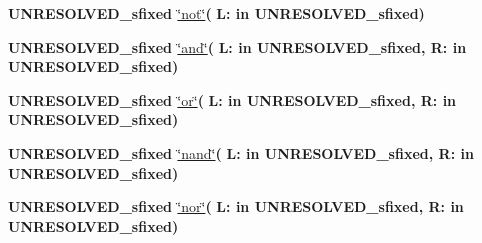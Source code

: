 \begin{DoxyCompactItemize}
\item 
{\bfseries {\bfseries \textcolor{vhdlchar}{U\+N\+R\+E\+S\+O\+L\+V\+E\+D\+\_\+sfixed}\textcolor{vhdlchar}{ }}} \hyperlink{class__fixed__pkg_a2e0c00aea2fff7197dbe8e20362fc7d8}{\char`\"{}not\char`\"{}}{\bfseries  ( }{\bfseries \textcolor{vhdlchar}{L\+: }\textcolor{stringliteral}{in }\textcolor{vhdlchar}{U\+N\+R\+E\+S\+O\+L\+V\+E\+D\+\_\+sfixed}}{\bfseries  )} 
\item 
{\bfseries {\bfseries \textcolor{vhdlchar}{U\+N\+R\+E\+S\+O\+L\+V\+E\+D\+\_\+sfixed}\textcolor{vhdlchar}{ }}} \hyperlink{class__fixed__pkg_adc4ad35b9dd0894e4fd7235d7f087dad}{\char`\"{}and\char`\"{}}{\bfseries  ( }{\bfseries \textcolor{vhdlchar}{L\+: }\textcolor{stringliteral}{in }\textcolor{vhdlchar}{U\+N\+R\+E\+S\+O\+L\+V\+E\+D\+\_\+sfixed}}{\bfseries  , \textcolor{vhdlchar}{R\+: }\textcolor{stringliteral}{in }\textcolor{vhdlchar}{U\+N\+R\+E\+S\+O\+L\+V\+E\+D\+\_\+sfixed}}{\bfseries  )} 
\item 
{\bfseries {\bfseries \textcolor{vhdlchar}{U\+N\+R\+E\+S\+O\+L\+V\+E\+D\+\_\+sfixed}\textcolor{vhdlchar}{ }}} \hyperlink{class__fixed__pkg_a41e213ebb1b825cf11e19cb15676a800}{\char`\"{}or\char`\"{}}{\bfseries  ( }{\bfseries \textcolor{vhdlchar}{L\+: }\textcolor{stringliteral}{in }\textcolor{vhdlchar}{U\+N\+R\+E\+S\+O\+L\+V\+E\+D\+\_\+sfixed}}{\bfseries  , \textcolor{vhdlchar}{R\+: }\textcolor{stringliteral}{in }\textcolor{vhdlchar}{U\+N\+R\+E\+S\+O\+L\+V\+E\+D\+\_\+sfixed}}{\bfseries  )} 
\item 
{\bfseries {\bfseries \textcolor{vhdlchar}{U\+N\+R\+E\+S\+O\+L\+V\+E\+D\+\_\+sfixed}\textcolor{vhdlchar}{ }}} \hyperlink{class__fixed__pkg_a84856af5530a77e6833c030318eb84e5}{\char`\"{}nand\char`\"{}}{\bfseries  ( }{\bfseries \textcolor{vhdlchar}{L\+: }\textcolor{stringliteral}{in }\textcolor{vhdlchar}{U\+N\+R\+E\+S\+O\+L\+V\+E\+D\+\_\+sfixed}}{\bfseries  , \textcolor{vhdlchar}{R\+: }\textcolor{stringliteral}{in }\textcolor{vhdlchar}{U\+N\+R\+E\+S\+O\+L\+V\+E\+D\+\_\+sfixed}}{\bfseries  )} 
\item 
{\bfseries {\bfseries \textcolor{vhdlchar}{U\+N\+R\+E\+S\+O\+L\+V\+E\+D\+\_\+sfixed}\textcolor{vhdlchar}{ }}} \hyperlink{class__fixed__pkg_a2b42e09d66558766a2039e125c86e6b1}{\char`\"{}nor\char`\"{}}{\bfseries  ( }{\bfseries \textcolor{vhdlchar}{L\+: }\textcolor{stringliteral}{in }\textcolor{vhdlchar}{U\+N\+R\+E\+S\+O\+L\+V\+E\+D\+\_\+sfixed}}{\bfseries  , \textcolor{vhdlchar}{R\+: }\textcolor{stringliteral}{in }\textcolor{vhdlchar}{U\+N\+R\+E\+S\+O\+L\+V\+E\+D\+\_\+sfixed}}{\bfseries  )} 
\item 

\end{DoxyCompactItemize}
